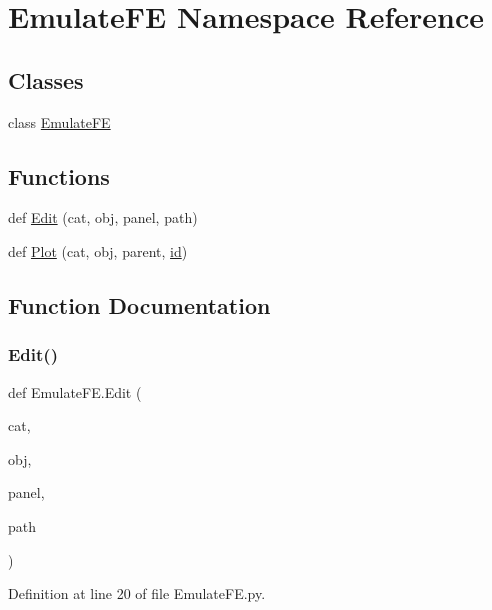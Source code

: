 \hypertarget{namespaceEmulateFE}{}\section{Emulate\+FE Namespace Reference}
\label{namespaceEmulateFE}
\subsection*{Classes}
\begin{DoxyCompactItemize}
\item 
class \hyperlink{classEmulateFE_1_1EmulateFE}{Emulate\+FE}
\end{DoxyCompactItemize}
\subsection*{Functions}
\begin{DoxyCompactItemize}
\item 
def \hyperlink{namespaceEmulateFE_acf6d71e0a6b073fbe4fa9a9e82316745}{Edit} (cat, obj, panel, path)
\item 
def \hyperlink{namespaceEmulateFE_abf2cc9ef25368158e094f1ac010185d2}{Plot} (cat, obj, parent, \hyperlink{classObject_af99145335cc61ff6e2798ea17db009d2}{id})
\end{DoxyCompactItemize}


\subsection{Function Documentation}
\mbox{\label{namespaceEmulateFE_acf6d71e0a6b073fbe4fa9a9e82316745}} 
\subsubsection{\texorpdfstring{Edit()}{Edit()}}
{\footnotesize\ttfamily def Emulate\+F\+E.\+Edit (\begin{DoxyParamCaption}\item[{}]{cat,  }\item[{}]{obj,  }\item[{}]{panel,  }\item[{}]{path }\end{DoxyParamCaption})}



Definition at line 20 of file Emulate\+F\+E.\+py.


